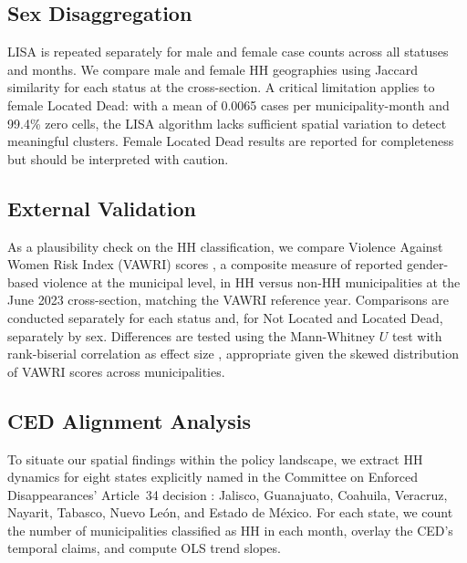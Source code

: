 \subsection{Sex Disaggregation}
\label{sec:sex_methods}

LISA is repeated separately for male and female case counts across all statuses and months.
We compare male and female HH geographies using Jaccard similarity for each status at the  cross-section.
A critical limitation applies to female Located Dead: with a mean of 0.0065 cases per municipality-month and 99.4\% zero cells, the LISA algorithm lacks sufficient spatial variation to detect meaningful clusters.
Female Located Dead results are reported for completeness but should be interpreted with  caution.



\subsection{External Validation}
\label{sec:vawri_methods}
As a plausibility check on the HH classification, we compare Violence Against Women Risk Index (VAWRI) scores \citep{escobar_vawri_2026}, a composite measure of reported gender-based violence at the municipal level, in HH versus non-HH municipalities at the June 2023 cross-section, matching the VAWRI reference year.
Comparisons are conducted separately for each status and, for Not Located and Located Dead, separately by sex.
Differences are tested using the Mann-Whitney $U$ test with rank-biserial correlation as effect size \citep{kerby_2014}, appropriate given the skewed distribution of VAWRI scores across municipalities.

\subsection{CED Alignment Analysis}
\label{sec:ced_methods}

To situate our spatial findings within the policy landscape, we extract HH dynamics for eight states explicitly named in the Committee on Enforced Disappearances' Article~34 decision \citep{CED_MEX_art34_2026}: Jalisco, Guanajuato, Coahuila, Veracruz, Nayarit, Tabasco, Nuevo Le\'{o}n, and Estado de M\'{e}xico.
For each state, we count the number of municipalities classified as HH in each month, overlay the CED's temporal claims, and compute OLS trend slopes.

